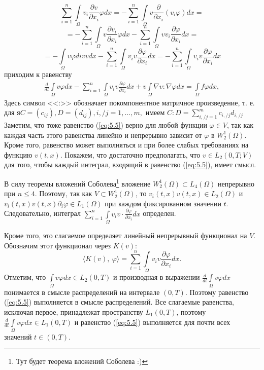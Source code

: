 $$\sum_{i=1}^{n}\int\limits_\Omega v_i\frac{\partial v}{\partial x_i}\varphi dx=-\sum_{i=1}^{n}\int\limits_\Omega v\frac{\partial}{\partial x_i}(v_i\varphi)dx=$$
$$=-\sum_{i=1}^{n}\int\limits_\Omega v\frac{\partial v_i}{\partial x_i}\varphi dx-\sum_{i=1}^{n}\int\limits_\Omega vv_i\frac{\partial\varphi}{\partial x_i} dx=$$
$$=-\int\limits_\Omega v\varphi div v dx-\sum_{i=1}^{n}\int\limits_\Omega v_i v\frac{\partial\varphi}{\partial x_i}dx=
-\sum_{i=1}^{n}\int\limits_\Omega v_i v\frac{\partial\varphi}{\partial x_i}dx$$
приходим к равенству
\begin{equation}\label{eq:5.5}
    \begin{gathered}
        \frac{d}{dt}\int\limits_\Omega v \varphi dx-\sum_{i=1}^{n}\int\limits_\Omega v_i v
        \frac{\partial \varphi }{\partial x_i}dx + v\int\limits_\Omega \nabla v :\nabla\varphi dx
        =\int\limits_\Omega f\varphi dx,
    \end{gathered}
\end{equation}
Здесь символ <<:>> обозначает покомпонентное матричное произведение, т. е. для $я C=(c_{ij}), D=(d_{ij}), i, / j=1,...,m,$ имеем $C:D=\sum_{i, / j=1}^{m} c_{i, / j}d_{i, / j}$
Заметим, что тоже равенство (\ref{eq:5.5}) верно для любой функции $\varphi\in V$, так как каждая часть этого равенства линейно и непрерывно зависит от
$\varphi$ в $W^{1}_{2}(\Omega)$. Кроме того, равенство может выполняться и при более слабых требованиях на функцию $v(t, x)$.
Покажем, что достаточно предполагать, что $v\in L_2(0, T;V)$ для того, чтобы каждый интеграл, входящий в равенство (\ref{eq:5.5}), имеет смысл.

В силу теоремы вложений Соболева\footnote{Тут будет теорема вложений Соболева :)} вложение $W^{1}_{2}(\Omega)\subset L_4(\Omega)$ непрерывно при $n \leqslant 4$.
Поэтому, так как $V\subset W^{1}_{2}(\Omega)$, то $v_i(t, x)v(t, x)\in L_2(\Omega)$ и $v_i(t, x)v(t, x)\partial_i\varphi \in L_1(\Omega)$
при каждом фиксированном значении $t$. Следовательно, интеграл $\sum_{i=1}^{n}\int\limits_\Omega v_iv\cdot\frac{\partial\varphi}{\partial x_i}dx$ определен.

Кроме того, это слагаемое определяет линейный непрерывный функционал на $V$. Обозначим этот функционал через $K(v)$:
$$\langle K(v), \ \varphi \rangle = \sum_{i=1}^{n}\int\limits_\Omega v_i v \frac{\partial \varphi}{\partial x_i}dx.$$
Отметим, что $\int\limits_\Omega v \varphi dx\in L_2(0, T)$ и производная в выражении \linebreak
$\frac{d}{dt}\int\limits_\Omega v \varphi dx$
понимается в смысле распределений на интервале $(0, T)$. Поэтому равенство (\ref{eq:5.5}) выполняется в смысле распределений.
Все слагаемые равенства, исключая первое, принадлежат пространству $L_1(0, T)$, поэтому $\frac{d}{dt}\int\limits_\Omega v \varphi dx\in L_1(0, T)$
и равенство (\ref{eq:5.5}) выполняется для почти всех значений $t\in (0, T)$.


